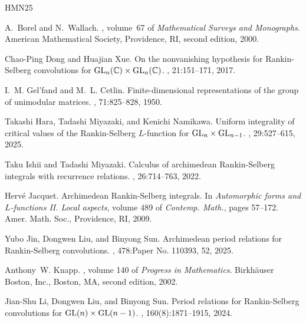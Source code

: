 \documentclass[12pt, a4paper]{amsart}
\theoremstyle{Theorem}
\theoremstyle{Theorem}
\theoremstyle{Theorem}
\theoremstyle{Theorem}
\theoremstyle{Plain}
\theoremstyle{Definition}
\begin{document}
	
	\begin{thebibliography}{HMN25}
		
		A.~Borel and N.~Wallach.
		, volume~67 of {\em Mathematical Surveys and Monographs}.
		\newblock American Mathematical Society, Providence, RI, second edition, 2000.
		
		Chao-Ping Dong and Huajian Xue.
		\newblock On the nonvanishing hypothesis for {R}ankin-{S}elberg convolutions
		for {${\rm GL}_n(\Bbb C)\times{\rm GL}_n(\Bbb C)$}.
		, 21:151--171, 2017.
		
		I.~M. Gel'fand and M.~L. Cetlin.
		\newblock Finite-dimensional representations of the group of unimodular
		matrices.
		, 71:825--828, 1950.
		
		Takashi Hara, Tadashi Miyazaki, and Kenichi Namikawa.
		\newblock Uniform integrality of critical values of the {R}ankin-{S}elberg
		{$L$}-function for {${\rm GL}_n\times {\rm GL}_{n-1}$}.
		, 29:527--615, 2025.
		
		Taku Ishii and Tadashi Miyazaki.
		\newblock Calculus of archimedean {R}ankin-{S}elberg integrals with recurrence
		relations.
		, 26:714--763, 2022.
		
		Herv\'e Jacquet.
		\newblock Archimedean {R}ankin-{S}elberg integrals.
		\newblock In {\em Automorphic forms and {$L$}-functions {II}. {L}ocal aspects},
		volume 489 of {\em Contemp. Math.}, pages 57--172. Amer. Math. Soc.,
		Providence, RI, 2009.
		
		Yubo Jin, Dongwen Liu, and Binyong Sun.
		\newblock Archimedean period relations for {R}ankin-{S}elberg convolutions.
		, 478:Paper No. 110393, 52, 2025.
		
		Anthony~W. Knapp.
		, volume 140 of {\em Progress
			in Mathematics}.
		\newblock Birkh\"auser Boston, Inc., Boston, MA, second edition, 2002.
		
		Jian-Shu Li, Dongwen Liu, and Binyong Sun.
		\newblock Period relations for {R}ankin-{S}elberg convolutions for {${\rm
				GL}(n)\times{\rm GL}(n-1)$}.
		, 160(8):1871--1915, 2024.
		

\end{thebibliography}
\end{document}
